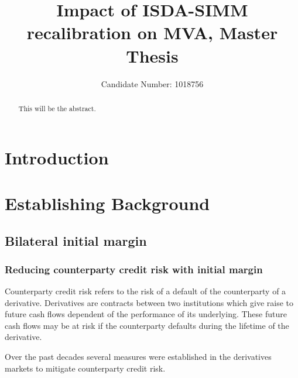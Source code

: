 \documentclass[12pt,a4paper]{article}
\title{Impact of ISDA-SIMM recalibration on MVA, Master Thesis}
\author{Candidate Number: 1018756}
\begin{document}
\maketitle

\thispagestyle{empty}

\newpage
\setcounter{page}{1}



\begin{abstract}
This will be the abstract.
\end{abstract}

\section{Introduction}

\section{Establishing Background}
\subsection{Bilateral initial margin}
\subsubsection{Reducing counterparty credit risk with initial margin}
Counterparty credit risk refers to the risk of a default of the counterparty of a derivative. Derivatives are contracts between two institutions which give raise to future cash flows dependent of the performance of its underlying. These future cash flows may be at risk if the counterparty defaults during the lifetime of the derivative. 

Over the past decades several measures were established in the derivatives markets to mitigate counterparty credit risk.
\end{document}
